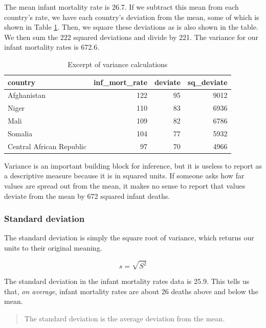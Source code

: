 \documentclass[
]{book}
\begin{document}
The mean infant mortality rate is 26.7. If we subtract this mean from each country's rate, we have each country's deviation from the mean, some of which is shown in Table \ref{tab:varcalcs}. Then, we square these deviations as is also shown in the table. We then sum the 222 squared deviations and divide by 221. The variance for our infant mortality rates is 672.6.

\begin{table}

\caption{\label{tab:varcalcs}Excerpt of variance calculations}
\centering
\begin{tabular}[t]{l|r|r|r}
\hline
country & inf\_mort\_rate & deviate & sq\_deviate\\
\hline
Afghanistan & 122 & 95 & 9012\\
\hline
Niger & 110 & 83 & 6936\\
\hline
Mali & 109 & 82 & 6786\\
\hline
Somalia & 104 & 77 & 5932\\
\hline
Central African Republic & 97 & 70 & 4966\\
\hline
\end{tabular}
\end{table}

Variance is an important building block for inference, but it is useless to report as a descriptive measure because it is in squared units. If someone asks how far values are spread out from the mean, it makes no sense to report that values deviate from the mean by 672 squared infant deaths.

\hypertarget{standard-deviation}{%
\subsubsection*{Standard deviation}\label{standard-deviation}}


The standard deviation is simply the square root of variance, which returns our units to their original meaning.

\begin{equation}
{\displaystyle s = \sqrt{S^2}}
\label{eq:sd}
\end{equation}

The standard deviation in the infant mortality rates data is 25.9. This tells us that, \emph{on average}, infant mortality rates are about 26 deaths above and below the mean.

\begin{quote}
The standard deviation is the average deviation from the mean.
\end{quote}
\end{document}
